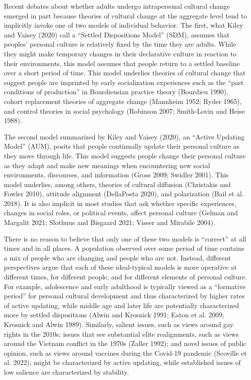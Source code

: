 \documentclass[
  12pt,
]{article}
\begin{document}
Recent debates about whether adults undergo intrapersonal cultural
change emerged in part because theories of cultural change at the
aggregate level tend to implicitly invoke one of two models of
individual behavior. The first, what Kiley and Vaisey (2020) call a
``Settled Dispositions Model'' (SDM), assumes that peoples' personal
culture is relatively fixed by the time they are adults. While they
might make temporary changes in their declarative culture in reaction to
their environments, this model assumes that people return to a settled
baseline over a short period of time. This model underlies theories of
cultural change that suggest people are imprinted by early socialization
experiences such as the ``past conditions of production'' in
Bourdieusian practice theory (Bourdieu 1990), cohort replacement
theories of aggregate change (Mannheim 1952; Ryder 1965), and control
theories in social psychology (Robinson 2007; Smith-Lovin and Heise
1988).

The second model summarized by Kiley and Vaisey (2020), an ``Active
Updating Model'' (AUM), posits that people continually update their
personal culture as they move through life. This model suggests people
change their personal culture as they adapt and make new meanings when
encountering new social environments, discourses, and information (Gross
2009; Swidler 2001). This model underlies, among others, theories of
cultural diffusion (Christakis and Fowler 2010), attitude alignment
(DellaPosta 2020), and polarization (Bail et al. 2018). It is also
implicit in most studies that ask whether specific experiences, changes
in social roles, or political events, affect personal culture (Gelman
and Margalit 2021; Slothuus and Bisgaard 2021; Visser and Mirabile
2004).

There is no reason to believe that only one of these two models is
``correct'' at all times and in all places. A population observed over
some period of time contains a mix of people who are changing and people
who are not. Instead, different perspectives argue that each of these
ideal-typical models is more operative at different times, for different
people, and for different elements of personal culture. For example,
adolescence and early adulthood is typically viewed as a ``formative
period'' for personal cultural development and thus characterized by
higher rates of active updating, while middle age and later life are
potentially characterized more by settled dispositions (Alwin and
Krosnick 1991; Eaton et al. 2009; Krosnick and Alwin 1989). Similarly,
salient issues, such as views around gay rights in the 2010s; issues
that see substantial elite realignments, such as views around the
Vietnam conflict in the 1970s (Zaller 1992); and novel issues of public
opinion, such as views around vaccines during the Covid-19 pandemic
(Scoville et al. 2022), might be characterized by active updating, while
established issues of low salience are characterized by stability.
\end{document}
